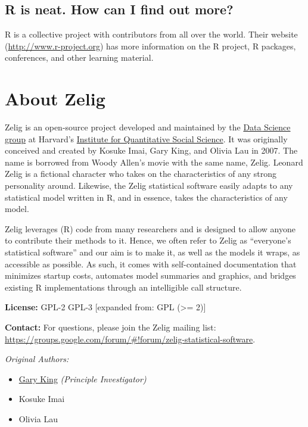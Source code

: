 \documentclass[letterpaper,10pt,english]{sphinxmanual}
\begin{document}
\section{R is neat. How can I find out more?}
\label{faq:r-is-neat-how-can-i-find-out-more}
R is a collective project with contributors from all over the world. Their website (\href{http://www.r-project.org}{http://www.r-project.org}) has more information on the R project, R packages, conferences, and other learning material.


\chapter{About Zelig}
\label{about:about}\label{about::doc}\label{about:about-zelig}
Zelig is an open-source project developed and maintained by the \href{http://datascience.iq.harvard.edu/}{Data Science group} at Harvard's \href{http://iq.harvard.edu}{Institute for Quantitative Social Science}. It was originally conceived and created by Kosuke Imai, Gary King, and Olivia Lau in 2007. The name is borrowed from Woody Allen's movie with the same name, Zelig. Leonard Zelig is a fictional character who takes on the characteristics of any strong personality around. Likewise, the Zelig statistical software easily adapts to any statistical model written in R, and in essence, takes the characteristics of any model.

Zelig leverages (R) code from many researchers and is designed to allow anyone to contribute their methods to it. Hence, we often refer to Zelig as ``everyone's statistical software'' and our aim is to make it, as well as the models it wraps, as accessible as possible. As such, it comes with self-contained documentation that minimizes startup costs, automates model summaries and graphics, and bridges existing R implementations through an intelligible call structure.

\textbf{License:} GPL-2 \textbar{} GPL-3 {[}expanded from: GPL (\textgreater{}= 2){]}

\textbf{Contact:} For questions, please join the Zelig mailing list:
\href{https://groups.google.com/forum/\#!forum/zelig-statistical-software}{https://groups.google.com/forum/\#!forum/zelig-statistical-software}.

\emph{Original Authors:}
\begin{itemize}
\item {} 
\href{http://gking.harvard.edu/}{Gary King} \emph{(Principle Investigator)}

\item {} 
Kosuke Imai

\item {} 
Olivia Lau

\end{itemize}
\end{document}
